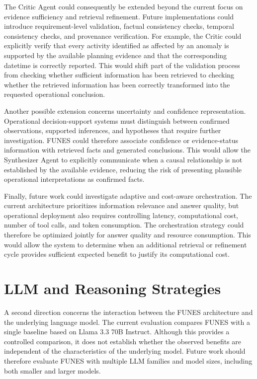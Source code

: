 The Critic Agent could consequently be extended beyond the current focus on evidence sufficiency and retrieval refinement. Future implementations could introduce requirement-level validation, factual consistency checks, temporal consistency checks, and provenance verification. For example, the Critic could explicitly verify that every activity identified as affected by an anomaly is supported by the available planning evidence and that the corresponding datetime is correctly reported. This would shift part of the validation process from checking whether sufficient information has been retrieved to checking whether the retrieved information has been correctly transformed into the requested operational conclusion.

Another possible extension concerns uncertainty and confidence representation. Operational decision-support systems must distinguish between confirmed observations, supported inferences, and hypotheses that require further investigation. FUNES could therefore associate confidence or evidence-status information with retrieved facts and generated conclusions. This would allow the Synthesizer Agent to explicitly communicate when a causal relationship is not established by the available evidence, reducing the risk of presenting plausible operational interpretations as confirmed facts.

Finally, future work could investigate adaptive and cost-aware orchestration. The current architecture prioritizes information relevance and answer quality, but operational deployment also requires controlling latency, computational cost, number of tool calls, and token consumption. The orchestration strategy could therefore be optimized jointly for answer quality and resource consumption. This would allow the system to determine when an additional retrieval or refinement cycle provides sufficient expected benefit to justify its computational cost.

\section{LLM and Reasoning Strategies}

A second direction concerns the interaction between the FUNES architecture and the underlying language model. The current evaluation compares FUNES with a single baseline based on Llama 3.3 70B Instruct. Although this provides a controlled comparison, it does not establish whether the observed benefits are independent of the characteristics of the underlying model. Future work should therefore evaluate FUNES with multiple LLM families and model sizes, including both smaller and larger models.

